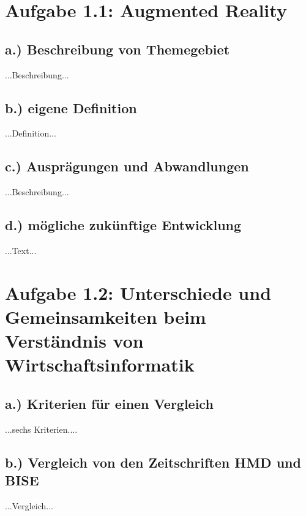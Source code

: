 \documentclass[12pt,utf8]{scrartcl}
\begin{document}
\thispagestyle{empty}
\tableofcontents
\newpage
\begin{flushleft}
\setcounter{page}{1}


\section{\label{sec:thema}Aufgabe 1.1: Augmented Reality}
\subsection{\label{sub:thema}a.) Beschreibung von Themegebiet}

...Beschreibung...

\subsection{\label{sub2:thema}b.) eigene Definition}

...Definition...

\subsection{\label{sub3:thema}c.) Ausprägungen und Abwandlungen}

...Beschreibung...

\subsection{\label{sub4:thema}d.) mögliche zukünftige Entwicklung}

...Text...


\section{\label{sec:einfuehrung}Aufgabe 1.2: Unterschiede und Gemeinsamkeiten beim Verständnis von Wirtschaftsinformatik}
\subsection{\label{sub:einfuehrung}a.) Kriterien für einen Vergleich}

...sechs Kriterien....

\subsection{\label{sub2:einfuehrung}b.) Vergleich von den Zeitschriften HMD und BISE}

...Vergleich...


\end{flushleft}
\end{document}
